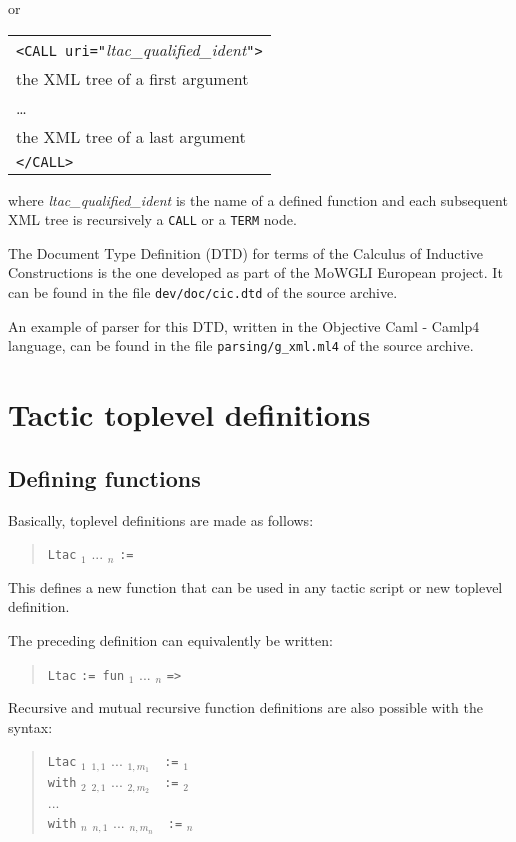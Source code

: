\noindent or 

\medskip
\begin{tabular}{l}
\texttt{<CALL uri="}\textsl{ltac\_qualified\_ident}\texttt{">}\\
the XML tree of a first argument\\
{\ldots}\\
the XML tree of a last argument\\
\texttt{</CALL>}\\
\end{tabular}

\medskip
\noindent where \textsl{ltac\_qualified\_ident} is the name of a
defined {\ltac} function and each subsequent XML tree is recursively a
\texttt{CALL} or a \texttt{TERM} node.

The Document Type Definition (DTD) for terms of the Calculus of
Inductive Constructions is the one developed as part of the MoWGLI
European project. It can be found in the file {\tt dev/doc/cic.dtd} of
the {\Coq} source archive.

An example of parser for this DTD, written in the Objective Caml -
Camlp4 language, can be found in the file {\tt parsing/g\_xml.ml4} of
the {\Coq} source archive.

\section[Tactic toplevel definitions]{Tactic toplevel definitions}

\subsection{Defining {\ltac} functions}

Basically, {\ltac} toplevel definitions are made as follows:
%
%
\begin{quote}
{\tt Ltac} {\ident} {\ident}$_1$ ... {\ident}$_n$ {\tt :=}
{\tacexpr}
\end{quote}
This defines a new {\ltac} function that can be used in any tactic
script or new {\ltac} toplevel definition.

\Rem The preceding definition can equivalently be written:
\begin{quote}
{\tt Ltac} {\ident} {\tt := fun} {\ident}$_1$ ... {\ident}$_n$
{\tt =>} {\tacexpr}
\end{quote}
Recursive and mutual recursive function definitions are also
possible with the syntax:
\begin{quote}
{\tt Ltac} {\ident}$_1$ {\ident}$_{1,1}$ ...
{\ident}$_{1,m_1}$~~{\tt :=} {\tacexpr}$_1$\\
{\tt with} {\ident}$_2$ {\ident}$_{2,1}$ ... {\ident}$_{2,m_2}$~~{\tt :=}
{\tacexpr}$_2$\\
...\\
{\tt with} {\ident}$_n$ {\ident}$_{n,1}$ ... {\ident}$_{n,m_n}$~~{\tt :=}
{\tacexpr}$_n$
\end{quote}

